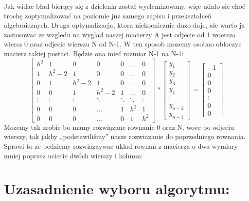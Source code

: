 \documentclass[12pt]{article}
\begin{document}
Jak widac bład biorący się z dzielenia został wyeleminowany, więc udało sie choć trochę zoptymalizować na poziomie juz samego zapisu i przekształceń algebraicznych. Druga optymalizacja, ktora niekoenicznie duzo daje, ale warto ja zastosowac ze wzgledu na wyglad naszej macierzy A jest odjecie od 1 woersza wiersz 0 oraz odjecie wierszu N od N-1. W ten sposob mozemy osobno obloczyc macierz takiej postaci. Będzie ona mieć rozmiar N-1 na N-1: 
\[
\begin{bmatrix}
    h^{2} & 1 & 0 & 0 & 0 & \dots & 0\\
    1 & h^{2}-2 & 1 & 0 & 0 & \dots & 0\\ 
    0 & 1 & h^{2}-2 & 1 & 0 & \dots & 0\\
    0 & 0 & 1 & h^{2}-2 & 1 &\dots & 0\\
    \vdots & \vdots & \vdots & \ddots & \ddots & \ddots & \vdots\\
    0 & 0 & 0 & \hdots & 1 & h^{2} & 1\\
    0 & 0 & 0 & \hdots & 0 & 1 & h^{2}
\end{bmatrix}
*
\begin{bmatrix}
    y_{1}\\
    y_{2}\\
    y_{3}\\
    y_{4}\\
    \vdots\\
    y_{n-2}\\
    y_{n-1}
\end{bmatrix}
=
\begin{bmatrix}
    -1\\
    0\\
    0\\
    0\\
    \vdots\\
    0\\
    0
\end{bmatrix}
\]
Mozemy tak zrobic bo mamy rozwiązane rownanie 0 oraz N, woec po odjeciu wierszy, tak jakby „podstawiliśmy” nasze rozwiazanie do poprzedniego rownania. Sprawi to ze bedziemy rozwiazaywac uklad rownan z macierza o dwa wymiary mniej poprzez uciecie dwóch wierszy i kolumn:

\section{Uzasadnienie wyboru algorytmu:}
\end{document}
